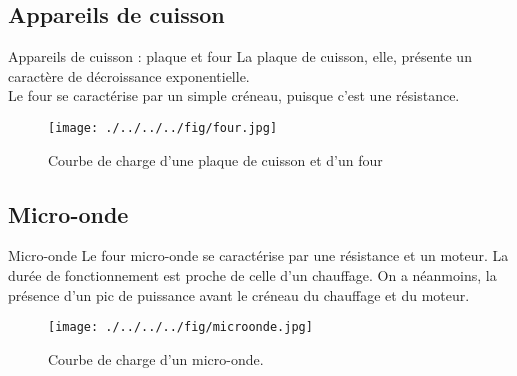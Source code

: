 \documentclass{beamer}
\begin{document}
\subsection{Appareils de cuisson}
\begin{frame}{Appareils de cuisson : plaque et four}
La plaque de cuisson, elle, présente un caractère de décroissance exponentielle.\\
Le four se caractérise par un simple créneau, puisque c'est une résistance.
\begin{figure}[!h]
\begin{center}
\texttt{[image: ./../../../fig/four.jpg]}
\caption{Courbe de charge d'une plaque de cuisson et d'un four}
\label{Figure18}
\end{center}
\end{figure}
\end{frame}

\subsection{Micro-onde}
\begin{frame}{Micro-onde}
Le four micro-onde se caractérise par une résistance et un moteur. La durée de fonctionnement est proche de celle d'un chauffage. On a néanmoins, la présence d'un pic de puissance avant le créneau du chauffage et du moteur.
\begin{figure}[!h]
\begin{center}
\texttt{[image: ./../../../fig/microonde.jpg]}
\caption{Courbe de charge d'un micro-onde.}
\label{Figure19}
\end{center}
\end{figure}
\end{frame}

\end{document}
